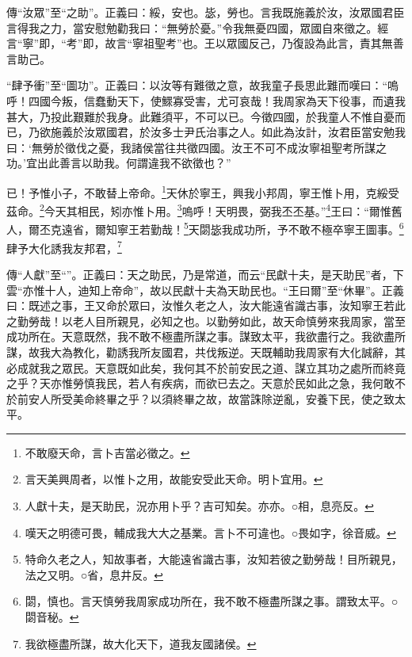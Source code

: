 {\noindent\zhuan{}\fzbyks 傳“汝眾”至“之助”。正義曰：綏，安也。毖，勞也。言我既施義於汝，汝眾國君臣言得我之力，當安慰勉勸我曰：“無勞於憂。”令我無憂四國，眾國自來徵之。經言“寧”即，“考”即，故言“寧祖聖考”也。王以眾國反己，乃復設為此言，責其無善言助己。 \par}

{\noindent\shu{}\fzkt “肆予衝”至“圖功”。正義曰：以汝等有難徵之意，故我童子長思此難而嘆曰：“嗚呼！四國今叛，信蠢動天下，使鰥寡受害，尤可哀哉！我周家為天下役事，而遺我甚大，乃投此艱難於我身。此難須平，不可以已。今徵四國，於我童人不惟自憂而已，乃欲施義於汝眾國君，於汝多士尹氏治事之人。如此為汝計，汝君臣當安勉我曰：‘無勞於徵伐之憂，我諸侯當往共徵四國。汝王不可不成汝寧祖聖考所謀之功。’宜出此善言以助我。何謂違我不欲徵也？” \par}

已！予惟小子，不敢替上帝命。\footnote{不敢廢天命，言卜吉當必徵之。}天休於寧王，興我小邦周，寧王惟卜用，克綏受茲命。\footnote{言天美興周者，以惟卜之用，故能安受此天命。明卜宜用。}今天其相民，矧亦惟卜用。\footnote{人獻十夫，是天助民，況亦用卜乎？吉可知矣。亦亦。○相，息亮反。}嗚呼！天明畏，弼我丕丕基。”\footnote{嘆天之明德可畏，輔成我大大之基業。言卜不可違也。○畏如字，徐音威。}王曰：“爾惟舊人，爾丕克遠省，爾知寧王若勤哉！\footnote{特命久老之人，知故事者，大能遠省識古事，汝知若彼之勤勞哉！目所親見，法之又明。○省，息井反。}天閟毖我成功所，予不敢不極卒寧王圖事。\footnote{閟，慎也。言天慎勞我周家成功所在，我不敢不極盡所謀之事。謂致太平。○閟音秘。}肆予大化誘我友邦君，\footnote{我欲極盡所謀，故大化天下，道我友國諸侯。}



{\noindent\zhuan{}\fzbyks 傳“人獻”至“”。正義曰：天之助民，乃是常道，而云“民獻十夫，是天助民”者，下雲“亦惟十人，迪知上帝命”，故以民獻十夫為天助民也。“王曰爾”至“休畢”。正義曰：既述之事，王又命於眾曰，汝惟久老之人，汝大能遠省識古事，汝知寧王若此之勤勞哉！以老人目所親見，必知之也。以勤勞如此，故天命慎勞來我周家，當至成功所在。天意既然，我不敢不極盡所謀之事。謀致太平，我欲盡行之。我欲盡所謀，故我大為教化，勸誘我所友國君，共伐叛逆。天既輔助我周家有大化誠辭，其必成就我之眾民。天意既如此矣，我何其不於前安民之道、謀立其功之處所而終竟之乎？天亦惟勞慎我民，若人有疾病，而欲已去之。天意於民如此之急，我何敢不於前安人所受美命終畢之乎？以須終畢之故，故當誅除逆亂，安養下民，使之致太平。 \par}


